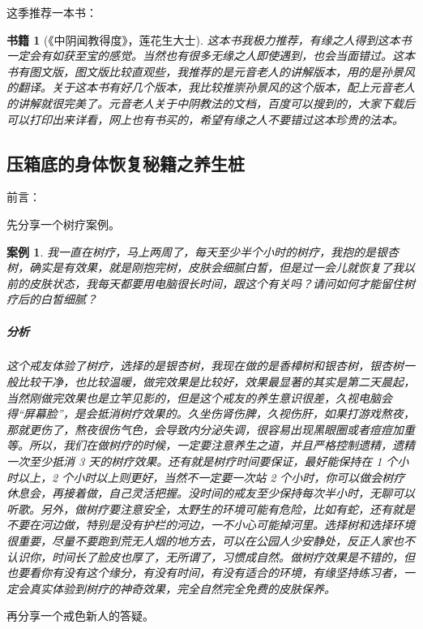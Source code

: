 \documentclass{ctexart}
\newtheorem{book}{书籍}
\newtheorem{case}{案例}
\begin{document}
这季推荐一本书：

\begin{book}[《中阴闻教得度》，莲花生大士]
    这本书我极力推荐，有缘之人得到这本书一定会有如获至宝的感觉。当然也有很多无缘之人即使遇到，也会当面错过。这本书有图文版，图文版比较直观些，我推荐的是元音老人的讲解版本，用的是孙景风的翻译。关于这本书有好几个版本，我比较推崇孙景风的这个版本，配上元音老人的讲解就很完美了。元音老人关于中阴教法的文档，百度可以搜到的，大家下载后可以打印出来详看，网上也有书买的，希望有缘之人不要错过这本珍贵的法本。
\end{book}

\subsection{压箱底的身体恢复秘籍之养生桩}

前言：

先分享一个树疗案例。

\begin{case}
    我一直在树疗，马上两周了，每天至少半个小时的树疗，我抱的是银杏树，确实是有效果，就是刚抱完树，皮肤会细腻白皙，但是过一会儿就恢复了我以前的皮肤状态，我每天都要用电脑很长时间，跟这个有关吗？请问如何才能留住树疗后的白皙细腻？
    \subparagraph{分析} 这个戒友体验了树疗，选择的是银杏树，我现在做的是香樟树和银杏树，银杏树一般比较干净，也比较温暖，做完效果是比较好，效果最显著的其实是第二天晨起，当然刚做完效果也是立竿见影的，但是这个戒友的养生意识很差，久视电脑会得“屏幕脸”，是会抵消树疗效果的。久坐伤肾伤脾，久视伤肝，如果打游戏熬夜，那就更伤了，熬夜很伤气色，会导致内分泌失调，很容易出现黑眼圈或者痘痘加重等。所以，我们在做树疗的时候，一定要注意养生之道，并且严格控制遗精，遗精一次至少抵消 3 天的树疗效果。还有就是树疗时间要保证，最好能保持在 1 个小时以上，2 个小时以上则更好，当然不一定要一次站 2 个小时，你可以做会树疗休息会，再接着做，自己灵活把握。没时间的戒友至少保持每次半小时，无聊可以听歌。另外，做树疗要注意安全，太野生的环境可能有危险，比如有蛇，还有就是不要在河边做，特别是没有护栏的河边，一不小心可能掉河里。选择树和选择环境很重要，尽量不要跑到荒无人烟的地方去，可以在公园人少安静处，反正人家也不认识你，时间长了脸皮也厚了，无所谓了，习惯成自然。做树疗效果是不错的，但也要看你有没有这个缘分，有没有时间，有没有适合的环境，有缘坚持练习者，一定会真实体验到树疗的神奇效果，完全自然完全免费的皮肤保养。
\end{case}

再分享一个戒色新人的答疑。
\end{document}

